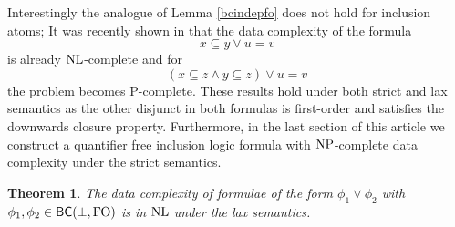 \documentclass{article}
\theoremstyle{plain}
\newtheorem{theorem}{Theorem}
\theoremstyle{definition}
\newcommand{\np}{{\rm NP}}
\newcommand{\nl}{{\rm NL}}
\begin{document}
Interestingly the analogue of Lemma \ref{bcindepfo} does not hold for inclusion atoms; It was recently shown in \cite{HannulaH19} that the data complexity of the formula
\begin{equation}\label{HH1}
 x\subseteq y \vee u=v 
\end{equation}
is already $\nl$-complete and for 
\begin{equation}\label{HH2}
(x\subseteq z \wedge y\subseteq z ) \vee u=v 
\end{equation}
the problem becomes $\mathrm{P}$-complete. These results hold under both strict and lax semantics as the other disjunct in both formulas is first-order and satisfies the downwards closure property.
Furthermore, in the last section of this article we construct a quantifier free inclusion logic formula with $\np$-complete data complexity under the strict semantics.
\begin{theorem}\label{thm13}
The data complexity of  formulae of the form $\phi_1\vee \phi_2$  with $\phi_1,\phi_2\in \mathsf{BC}(\bot,{\rm FO})$ is in $\nl$ under the lax semantics.
\end{theorem}
\end{document}
